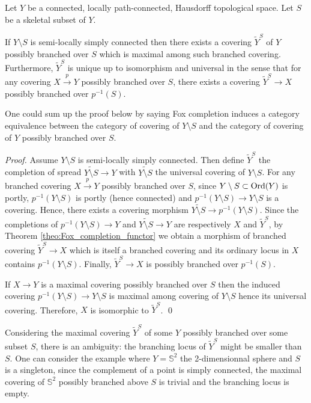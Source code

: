 \begin{prop}\label{prop:universality} Let $Y$ be a connected, locally path-connected, Hausdorff topological space.  Let $S$ be a skeletal subset of $Y$.

If $Y\setminus S$ is semi-locally simply connected then  there exists a covering $\widetilde Y^S$ of $Y$ possibly branched over $S$ which is maximal among such branched covering.
Furthermore, $\widetilde Y^S$
 is unique up to isomorphism and universal in the sense that for any covering $X\xrightarrow{p} Y$ possibly branched over $S$, there exists a covering $\widetilde Y^S\rightarrow X$ possibly branched over $p^{-1}(S)$.
\end{prop}
\begin{rem}
One could sum up the proof below by saying Fox completion induces a category equivalence between the category of covering of $Y\setminus S$  and the category of covering of $Y$ possibly branched over $S$.
\end{rem}
\begin{proof} 


 Assume $Y\setminus S$ is semi-locally simply connected. Then define $\widetilde Y^S$ the completion of spread $\widetilde {Y\setminus S} \rightarrow Y$ with $\widetilde {Y\setminus S}$ the universal covering of $Y\setminus S$. For any branched covering $X\xrightarrow{p}Y$ possibly branched over $S$, since $Y\setminus S\subset \mathrm{Ord}(Y)$ is portly, $p^{-1}(Y\setminus S)$ is portly (hence connected) and $p^{-1}(Y\setminus S) \rightarrow Y\setminus S$ is a covering. Hence, there exists a covering morphism $\widetilde {Y\setminus S} \rightarrow p^{-1}(Y\setminus S) $. Since the completions of 
 $p^{-1}(Y\setminus S) \rightarrow Y$ and $\widetilde {Y\setminus S}\rightarrow Y$ are respectively $X$ and $\widetilde Y^S$, by Theorem \ref{theo:Fox_completion_functor} we obtain a morphism of branched covering 
 $\widetilde Y^S \rightarrow X$ which is itself a branched covering and its ordinary locus in $X$ contains $p^{-1}(Y\setminus S)$. Finally, $\widetilde Y^S \rightarrow X$ is possibly branched over $p^{-1}(S)$. 
 
 If $X\rightarrow Y$ is a maximal  covering possibly branched over $S$ then the induced covering $p^{-1}(Y\setminus S)\rightarrow Y\setminus S$  is maximal among covering of $Y\setminus S$ hence its universal covering. Therefore, $X$ is isomorphic to $\widetilde Y^S$.
\qed\end{proof}
\begin{rem}
 Considering the maximal covering $\widetilde Y^S$ of some $Y$ possibly branched over some subset $S$, there is an ambiguity: the branching locus of $\widetilde Y^S$ might be smaller than $S$. One can consider the example where $Y=\mathbb S^2$ the 2-dimensionnal sphere and $S$ is a singleton, since the complement of a point is simply connected, the maximal covering of $\mathbb S^2$ possibly branched above $S$ is trivial and the branching locus is empty. 
 \end{rem}


